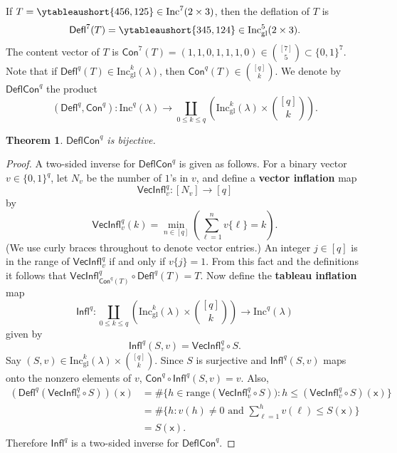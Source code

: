 \documentclass[12pt]{amsart}
\newcommand{\x}{\ensuremath{\mathsf{x}}}
\newtheorem{theorem}{Theorem}[section]
\theoremstyle{definition}
\newenvironment{example}
  {\pushQED{\qed}\renewcommand{\qedsymbol}{$\diamondsuit$}\examplex}
  {\popQED\endexamplex}
\theoremstyle{remark}
\numberwithin{equation}{section}
\newcommand{\inc}{\ensuremath{\mathrm{Inc}}}
\newcommand{\incgl}{\inc_{\mathrm{gl}}}
\newcommand{\deflate}{\ensuremath{\mathsf{Defl}}}
\newcommand{\inflate}{\ensuremath{\mathsf{VecInfl}}}
\newcommand{\tinflate}{\ensuremath{\mathsf{Infl}}}
\newcommand{\content}{\ensuremath{\mathsf{Con}}}
\newcommand{\compress}{\ensuremath{\mathsf{DeflCon}}}
\begin{document}
\begin{example}\label{ex:deflate}
If $T = \ytableaushort{456,125} \in \inc^7(2 \times 3)$, then the deflation of $T$ is \[\deflate^7(T) = \ytableaushort{345,124} \in \incgl^5(2 \times 3).\] The content vector of $T$ is $\content^7(T) = (1,1,0,1,1,1,0) \in \binom{[7]}{5} \subset \{0,1\}^7$.
\end{example}
Note that if $\deflate^q(T) \in \incgl^k(\lambda)$, then $\content^q(T) \in \binom{[q]}{k}$. We denote by $\compress^q$ the product
\[
(\deflate^q,\content^q) : \inc^q(\lambda) \to \coprod_{0 \leq k \leq q} \left( \incgl^k(\lambda) \times \binom{[q]}{k} \right).
\] 
\begin{theorem}\label{thm:compressbijective} $\compress^q$ is bijective.
\end{theorem}
\begin{proof}
A two-sided inverse for $\compress^q$ is given as follows. 
For a binary vector $v \in \{0,1\}^{q}$, let $N_v$ be the number of $1$'s in $v$, and define a {\bf vector inflation} map \[\inflate^q_v : [N_v] \to [q]\] by
\[ \inflate^q_v(k) = \min_{n \in [q]} \left( \sum_{\ell = 1}^n v\lbrace \ell \rbrace = k \right).\] (We use curly braces throughout to denote vector entries.) An integer $j \in [q]$ is in the range of $\inflate^q_v$ if and only if $v\lbrace j \rbrace = 1$. From this fact and the definitions it follows that $\inflate^q_{\content^q(T)} \circ \deflate^q(T) = T$. Now define the {\bf tableau inflation} map 
\[
\tinflate^q : \coprod_{0 \leq k \leq q} \left( \incgl^k(\lambda) \times \binom{[q]}{k} \right) \to \inc^q(\lambda)
\]
given by 
\[
\tinflate^q(S,v) = \inflate^q_v \circ S.
\]
Say $(S,v) \in \incgl^k(\lambda) \times \binom{[q]}{k}$. Since $S$ is surjective and $\tinflate^q(S,v)$ maps onto the nonzero elements of $v$, $\content^q \circ \tinflate^q(S,v) = v$.  Also,
\begin{align*}
 (\deflate^q(\inflate^q_v \circ S))(\x) &= \# \{ h \in \mathrm{range}(\inflate^q_v \circ S)): h \leq (\inflate^q_v \circ S)(\x) \} \\  
 &= \# \{ h: v(h) \neq 0 \text{ and } \sum_{\ell = 1}^h v(\ell) \leq S(\x)  \} \\
 &= S(\x).
\end{align*}
Therefore $\tinflate^q$ is a two-sided inverse for $\compress^q$.
\end{proof} 
\end{document}
